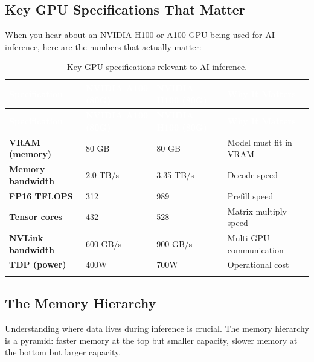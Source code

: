 \documentclass[12pt, twoside, openright]{book}
\begin{document}
\subsection{Key GPU Specifications That Matter}

When you hear about an NVIDIA H100 or A100 GPU being used for AI
inference, here are the numbers that actually matter:

\vspace{6pt}
\begin{longtable}{>{\bfseries}p{3.5cm} p{3.2cm} p{3.2cm} p{2.5cm}}
\rowcolor{tableheadbg}
\textcolor{white}{\textbf{Specification}} &
\textcolor{white}{\textbf{NVIDIA A100 (80G)}} &
\textcolor{white}{\textbf{NVIDIA H100 (80G)}} &
\textcolor{white}{\textbf{Why It Matters}} \\
\toprule
\endfirsthead
\rowcolor{tableheadbg}
\textcolor{white}{\textbf{Specification}} &
\textcolor{white}{\textbf{NVIDIA A100 (80G)}} &
\textcolor{white}{\textbf{NVIDIA H100 (80G)}} &
\textcolor{white}{\textbf{Why It Matters}} \\
\toprule
\endhead
VRAM (memory) & 80 GB & 80 GB & Model must fit in VRAM \\
Memory bandwidth & 2.0 TB/s & 3.35 TB/s & Decode speed \\
FP16 TFLOPS & 312 & 989 & Prefill speed \\
Tensor cores & 432 & 528 & Matrix multiply speed \\
NVLink bandwidth & 600 GB/s & 900 GB/s & Multi-GPU communication \\
TDP (power) & 400W & 700W & Operational cost \\
\bottomrule
\caption{Key GPU specifications relevant to AI inference.}
\label{tab:gpu-specs}
\end{longtable}

\subsection{The Memory Hierarchy}

Understanding where data lives during inference is crucial.
The memory hierarchy is a pyramid: faster memory at the top but
smaller capacity, slower memory at the bottom but larger capacity.
\end{document}
